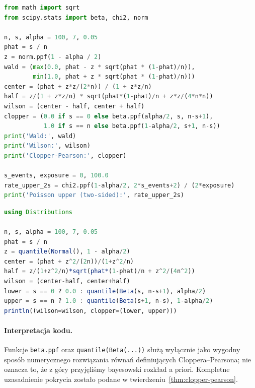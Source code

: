 \begin{lstlisting}[language=Python,caption={Porównanie przedziałów Walda, Wilsona i Cloppera--Pearsona oraz granica dla Poissona (SciPy).}]
from math import sqrt
from scipy.stats import beta, chi2, norm

n, s, alpha = 100, 7, 0.05
phat = s / n
z = norm.ppf(1 - alpha / 2)
wald = (max(0.0, phat - z * sqrt(phat * (1-phat)/n)),
        min(1.0, phat + z * sqrt(phat * (1-phat)/n)))
center = (phat + z*z/(2*n)) / (1 + z*z/n)
half = z/(1 + z*z/n) * sqrt(phat*(1-phat)/n + z*z/(4*n*n))
wilson = (center - half, center + half)
clopper = (0.0 if s == 0 else beta.ppf(alpha/2, s, n-s+1),
           1.0 if s == n else beta.ppf(1-alpha/2, s+1, n-s))
print('Wald:', wald)
print('Wilson:', wilson)
print('Clopper-Pearson:', clopper)

s_events, exposure = 0, 100.0
rate_upper_2s = chi2.ppf(1-alpha/2, 2*s_events+2) / (2*exposure)
print('Poisson upper (two-sided):', rate_upper_2s)
\end{lstlisting}

\begin{lstlisting}[language=Julia,caption={Przedział Wilsona i dokładny przedział dwumianowy w Julii (Distributions.jl).}]
using Distributions

n, s, alpha = 100, 7, 0.05
phat = s / n
z = quantile(Normal(), 1 - alpha/2)
center = (phat + z^2/(2n))/(1+z^2/n)
half = z/(1+z^2/n)*sqrt(phat*(1-phat)/n + z^2/(4n^2))
wilson = (center-half, center+half)
lower = s == 0 ? 0.0 : quantile(Beta(s, n-s+1), alpha/2)
upper = s == n ? 1.0 : quantile(Beta(s+1, n-s), 1-alpha/2)
println((wilson=wilson, clopper=(lower, upper)))
\end{lstlisting}

\paragraph{Interpretacja kodu.}
Funkcje \texttt{beta.ppf} oraz \texttt{quantile(Beta(...))}
służą wyłącznie jako wygodny sposób numerycznego
rozwiązania równań definiujących Cloppera--Pearsona;
nie oznacza to, że z góry przyjęliśmy bayesowski rozkład
a priori. Kompletne uzasadnienie pokrycia zostało podane
w twierdzeniu~\ref{thm:clopper-pearson}.


